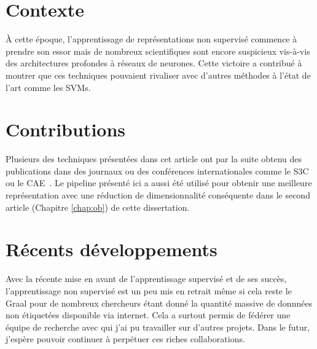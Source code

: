 \section{Contexte}

\`{A} cette \'{e}poque, l'apprentissage de repr\'{e}sentations non
supervis\'{e} commence \`{a} prendre son essor mais de nombreux scientifiques
sont encore suspicieux vis-\`{a}-vis des architectures profondes à réseaux de
neurones. Cette victoire a contribu\'{e} \`{a} montrer que ces techniques
pouvaient rivaliser avec d'autres m\'{e}thodes \`{a} l'\'{e}tat de l'art comme
les SVMs.

\section{Contributions}

Plusieurs des techniques pr\'{e}sent\'{e}es dans cet article ont par la suite
obtenu des publications dans des journaux ou des conf\'{e}rences
internationales comme le S3C~\citep{Courville+al-2011} ou le
CAE~\citep{Rifai+al-2011}. Le pipeline pr\'{e}sent\'{e} ici a aussi \'{e}t\'{e}
utilis\'{e} pour obtenir une meilleure repr\'{e}sentation avec une
r\'{e}duction de dimensionnalit\'{e} cons\'{e}quente dans le second article
(Chapitre \ref{chap:ob}) de cette dissertation. 

\section{R\'{e}cents d\'{e}veloppements}

Avec la r\'{e}cente mise en avant de l'apprentissage supervis\'{e} et de ses
succ\`{e}s, l'apprentissage non supervis\'{e} est un peu mis en retrait
m\^{e}me si cela reste le Graal pour de nombreux chercheurs \'{e}tant donn\'{e}
la quantit\'{e} massive de donnn\'{e}es non étiquetées disponible via
internet. Cela a surtout permis de f\'{e}d\'{e}rer une \'{e}quipe de recherche
avec qui j'ai pu travailler sur d'autres projets. Dans le futur, j'esp\`{e}re
pouvoir continuer \`{a} perp\'{e}tuer ces riches collaborations.
